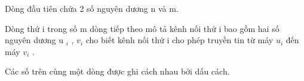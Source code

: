Dòng đầu tiên chứa 2 số nguyên dương n và m.

Dòng thứ i trong số m dòng tiếp theo mô tả kênh nối thứ i bao gồm hai số nguyên dương u­ $_ i $ , $v_{i}$ cho biết kênh nối thứ i cho phép truyền tin từ máy $u_{i}$ đến máy $v_{i}$ .

Các số trên cùng một dòng được ghi cách nhau bởi dấu cách.